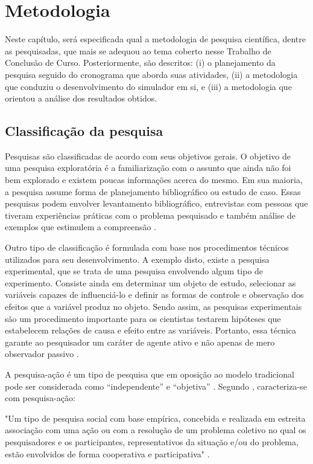 \chapter[Metodologia]{Metodologia}

Neste capítulo, será especificada qual a metodologia de pesquisa científica, dentre as pesquisadas, que mais se adequou ao tema coberto nesse Trabalho de Conclusão de Curso. Posteriormente, são descritos: (i) o planejamento da pesquisa seguido do cronograma que aborda suas atividades, (ii) a metodologia que conduziu o desenvolvimento do simulador em si, e (iii) a metodologia que orientou a análise dos resultados obtidos.

\section{Classificação da pesquisa}

Pesquisas são classificadas de acordo com seus objetivos gerais. O objetivo de uma pesquisa exploratória é a familiarização com o assunto que ainda não foi bem explorado e existem poucas informações acerca do mesmo. Em sua maioria, a pesquisa assume forma de planejamento bibliográfico ou estudo de caso. Essas pesquisas podem envolver levantamento bibliográfico, entrevistas com pessoas que tiveram experiências práticas com o problema pesquisado e também análise de exemplos que estimulem a compreensão \cite{gil}.

Outro tipo de classificação é formulada com base nos procedimentos técnicos utilizados para seu desenvolvimento. A exemplo disto, existe a pesquisa experimental, que se trata de uma pesquisa envolvendo algum tipo de experimento. Consiste ainda em determinar um objeto de estudo, selecionar as variáveis capazes de influenciá-lo e definir as formas de controle e observação dos efeitos que a variável produz no objeto. Sendo assim, as pesquisas experimentais são um procedimento importante para os cientistas testarem hipóteses que estabelecem relações de causa e efeito entre as variáveis. Portanto, essa técnica garante ao pesquisador um caráter de agente ativo e não apenas de mero observador passivo \cite{tafner}.

A pesquisa-ação é um tipo de pesquisa que em oposição ao modelo tradicional pode
ser considerada como “independente” e “objetiva” \cite{rocha}. Segundo , caracteriza-se com pesquisa-ação:

\begin{citacao}
\begin{normalsize}
"Um tipo de pesquisa social com base empírica, concebida e realizada em estreita associação com uma ação ou com a resolução de um problema coletivo no qual os pesquisadores e os participantes, representativos da situação e/ou do problema, estão envolvidos de forma cooperativa e participativa" .
\end{normalsize}
\end{citacao}

